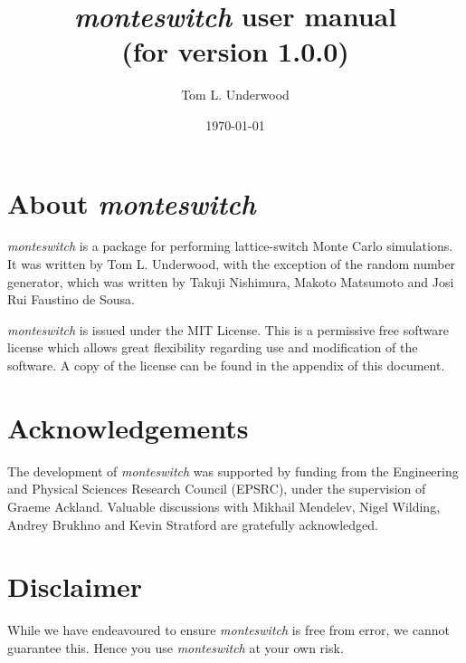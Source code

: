 \documentclass{report}
\begin{document}
\sloppy

\title{\emph{monteswitch} user manual \\ (for version 1.0.0) }
\author{Tom L. Underwood}
\date{\today}
\maketitle

\chapter*{About \emph{monteswitch}}
\emph{monteswitch} is a package for performing lattice-switch Monte Carlo simulations. It was written by Tom L. Underwood, with the
exception of the random number generator, which was written by Takuji Nishimura, Makoto Matsumoto and Josi Rui Faustino de Sousa.

\emph{monteswitch} is issued under the MIT License. This is a permissive free software license which allows great flexibility
regarding use and modification of the software. A copy of the license can be found in the appendix of this document.


\chapter*{Acknowledgements}
The development of \emph{monteswitch} was supported by funding from the Engineering and Physical Sciences Research Council (EPSRC),
under the supervision of Graeme Ackland. Valuable discussions with Mikhail Mendelev, Nigel Wilding, Andrey Brukhno and Kevin Stratford 
are gratefully acknowledged.

\chapter*{Disclaimer}
While we have endeavoured to ensure \emph{monteswitch} is free from error, we cannot guarantee this. Hence you use \emph{monteswitch}
at your own risk.


\end{document}
